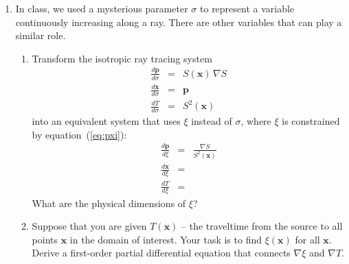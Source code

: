 \begin{enumerate}
\item In class, we used a mysterious parameter $\sigma$ to represent a
  variable continuously increasing along a ray. There are other
  variables that can play a similar role.
  \begin{enumerate}
  \item Transform the isotropic ray tracing system
    \begin{eqnarray}
      \label{eq:psigma}
      \frac{d \mathbf{p}}{d \sigma} & = & S(\mathbf{x})\,\nabla S \\
      \label{eq:xsigma}
      \frac{d \mathbf{x}}{d \sigma} & = & \mathbf{p} \\
      \label{eq:tsigma}
      \frac{d T}{d \sigma} & = & S^2(\mathbf{x})
    \end{eqnarray}
    into an equivalent system that uses $\xi$ instead of
    $\sigma$, where $\xi$ is constrained by equation~(\ref{eq:pxi}):
    \begin{eqnarray} 
      \label{eq:pxi}
      \frac{d \mathbf{p}}{d \xi} & = & \frac{\nabla S}{S^2(\mathbf{x})} \\
      \label{eq:xxi}
      \frac{d \mathbf{x}}{d \xi} & = & \\ 
      \label{eq:txi}
      \frac{d T}{d \xi} & = & 
    \end{eqnarray}
    What are the physical dimensions of $\xi$?
  \item Suppose that you are given $T(\mathbf{x})$ -- the traveltime from
    the source to all points $\mathbf{x}$ in the domain of
    interest. Your task is to find $\xi(\mathbf{x})$ for all
    $\mathbf{x}$. Derive a first-order partial differential equation
    that connects $\nabla \xi$ and $\nabla T$.
  \end{enumerate}


\end{enumerate}
